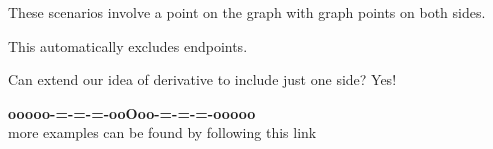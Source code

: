 \documentclass{ximera}
\begin{document}
These scenarios involve a point on the graph with graph points on both sides.

This automatically excludes endpoints.


Can extend our idea of derivative to include just one side? Yes!



\begin{center}
\textbf{\textcolor{green!50!black}{ooooo-=-=-=-ooOoo-=-=-=-ooooo}} \\

more examples can be found by following this link\\ 

\end{center}
\end{document}
